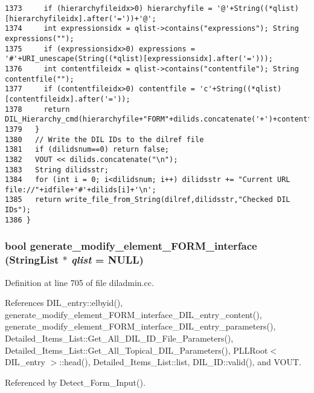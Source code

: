 \begin{verbatim}
1373     if (hierarchyfileidx>0) hierarchyfile = '@'+String((*qlist)[hierarchyfileidx].after('='))+'@';
1374     int expressionsidx = qlist->contains("expressions"); String expressions("");
1375     if (expressionsidx>0) expressions = '#'+URI_unescape(String((*qlist)[expressionsidx].after('=')));
1376     int contentfileidx = qlist->contains("contentfile"); String contentfile("");
1377     if (contentfileidx>0) contentfile = 'c'+String((*qlist)[contentfileidx].after('='));
1378     return DIL_Hierarchy_cmd(hierarchyfile+"FORM"+dilids.concatenate('+')+contentfile+expressions,maxdepth);
1379   }
1380   // Write the DIL IDs to the dilref file
1381   if (dilidsnum==0) return false;
1382   VOUT << dilids.concatenate("\n");
1383   String dilidsstr;
1384   for (int i = 0; i<dilidsnum; i++) dilidsstr += "Current URL      file://"+idfile+'#'+dilids[i]+'\n';
1385   return write_file_from_String(dilref,dilidsstr,"Checked DIL IDs");
1386 }
\end{verbatim}\normalsize 
{}
\subsubsection{\setlength{\rightskip}{0pt plus 5cm}bool generate\_\-modify\_\-element\_\-FORM\_\-interface ({\bf String\-List} $\ast$ {\em qlist} = NULL)}\label{diladmin_8cc_a10}




Definition at line 705 of file diladmin.cc.

References DIL\_\-entry::elbyid(), generate\_\-modify\_\-element\_\-FORM\_\-interface\_\-DIL\_\-entry\_\-content(), generate\_\-modify\_\-element\_\-FORM\_\-interface\_\-DIL\_\-entry\_\-parameters(), Detailed\_\-Items\_\-List::Get\_\-All\_\-DIL\_\-ID\_\-File\_\-Parameters(), Detailed\_\-Items\_\-List::Get\_\-All\_\-Topical\_\-DIL\_\-Parameters(), PLLRoot$<$ DIL\_\-entry $>$::head(), Detailed\_\-Items\_\-List::list, DIL\_\-ID::valid(), and VOUT.

Referenced by Detect\_\-Form\_\-Input().



